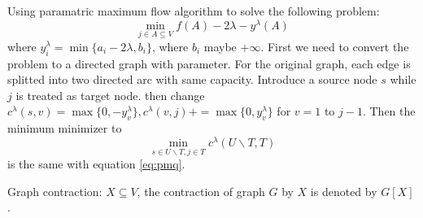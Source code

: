 \documentclass{article}
\begin{document}
Using paramatric maximum flow algorithm to solve the following problem:
\begin{equation}\label{eq:pmq}
\min_{j \in A \subseteq V} f(A) - 2\lambda - y^{\lambda}(A)
\end{equation}
where
$y^{\lambda}_i = \min\{a_i - 2\lambda, b_i\}$, where $b_i$ maybe $+\infty$.
First we need to convert the problem to a directed graph with parameter.
For the original graph, each edge is splitted into two directed arc with same capacity.
Introduce a source node $s$ while $j$ is treated as target node.  then change
$c^{\lambda}(s,v)=\max\{0, -y^{\lambda}_v\}, c^{\lambda}(v,j) += \max\{0, y^{\lambda}_v\}$ for $ v=1 $ to $j-1$. Then the minimum minimizer to 
\begin{equation}\label{eq:pmqe}
\min_{s\in U\backslash T, j\in T}c^{\lambda}(U\backslash T, T)
\end{equation}
is the same with equation \eqref{eq:pmq}.

Graph contraction: $X\subseteq V$, the contraction of graph $G$ by $X$ is denoted by $G[X]$.
\end{document}
